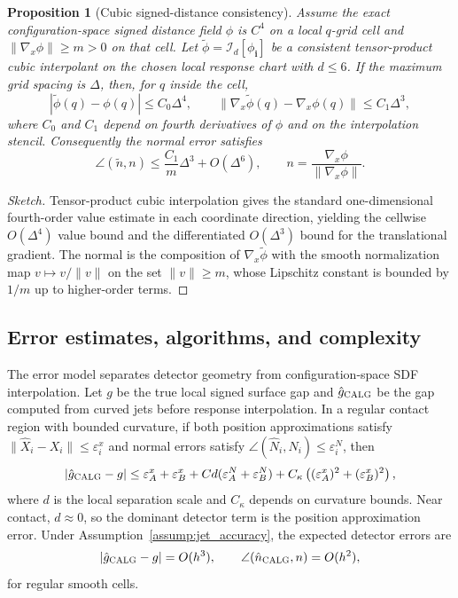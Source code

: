 \documentclass[preprint,12pt]{elsarticle}
\newtheorem{proposition}{Proposition}
\newcommand{\eps}{\varepsilon}
\newcommand{\calg}{\textsc{CALG}}
\begin{document}
\begin{proposition}[Cubic signed-distance consistency]
\label{prop:tricubic_consistency}
Assume the exact configuration-space signed distance field $\phi$ is $C^4$ on a local $q$-grid cell and $\|\nabla_x\phi\|\ge m>0$ on that cell. Let $\tilde\phi=\mathcal I_d[\phi_{\mathbf i}]$ be a consistent tensor-product cubic interpolant on the chosen local response chart with $d\le6$. If the maximum grid spacing is $\Delta$, then, for $q$ inside the cell,
\begin{equation}
    |\tilde\phi(q)-\phi(q)|\le C_0\Delta^4,
    \qquad
    \|\nabla_x\tilde\phi(q)-\nabla_x\phi(q)\|\le C_1\Delta^3,
    \label{eq:tricubic_error}
\end{equation}
where $C_0$ and $C_1$ depend on fourth derivatives of $\phi$ and on the interpolation stencil. Consequently the normal error satisfies
\begin{equation}
    \angle(\tilde n,n)\le \frac{C_1}{m}\Delta^3+O(\Delta^6),
    \qquad n=\frac{\nabla_x\phi}{\|\nabla_x\phi\|}.
    \label{eq:tricubic_normal_error}
\end{equation}
\end{proposition}

\begin{proof}[Sketch]
Tensor-product cubic interpolation gives the standard one-dimensional fourth-order value estimate in each coordinate direction, yielding the cellwise $O(\Delta^4)$ value bound and the differentiated $O(\Delta^3)$ bound for the translational gradient. The normal is the composition of $\nabla_x\tilde\phi$ with the smooth normalization map $v\mapsto v/\|v\|$ on the set $\|v\|\ge m$, whose Lipschitz constant is bounded by $1/m$ up to higher-order terms.
\end{proof}

\subsection{Error estimates, algorithms, and complexity}

The error model separates detector geometry from configuration-space SDF interpolation. Let $g$ be the true local signed surface gap and $\hat g_{\calg}$ be the gap computed from curved jets before response interpolation. In a regular contact region with bounded curvature, if both position approximations satisfy $\|\hat X_i-X_i\|\le \eps_i^x$ and normal errors satisfy $\angle(\hat N_i,N_i)\le \eps_i^N$, then
\begin{equation}
    |\hat g_{\calg}-g|\le
    \eps_A^x+\eps_B^x
    + C d (\eps_A^N+\eps_B^N)
    + C_\kappa \left((\eps_A^x)^2+(\eps_B^x)^2\right),
    \label{eq:gap_error}
\end{equation}
where $d$ is the local separation scale and $C_\kappa$ depends on curvature bounds. Near contact, $d\approx 0$, so the dominant detector term is the position approximation error. Under Assumption~\ref{assump:jet_accuracy}, the expected detector errors are
\begin{equation}
    |\hat g_{\calg}-g|=O(h^3),
    \qquad
    \angle(\hat n_{\calg},n)=O(h^2),
    \label{eq:expected_convergence}
\end{equation}
for regular smooth cells.
\end{document}
